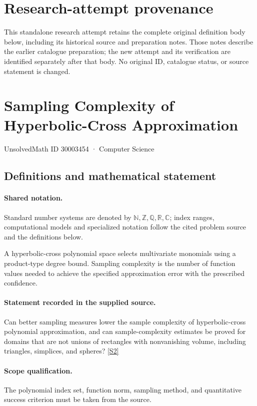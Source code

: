 \documentclass[11pt]{article}
\begin{document}
\section*{Research-attempt provenance}
This standalone research attempt retains the complete original definition body below,
including its historical source and preparation notes. Those notes describe the
earlier catalogue preparation; the new attempt and its verification are identified
separately after that body. No original ID, catalogue status, or source statement is changed.

\section{Sampling Complexity of Hyperbolic-Cross Approximation}\label{30003454}
{\small UnsolvedMath ID 30003454 · Computer Science}
\subsection{Definitions and mathematical statement}

\paragraph{Shared notation.}Standard number systems are denoted by $\mathbb N,\mathbb Z,\mathbb Q,\mathbb R,\mathbb C$; index ranges, computational models and specialized notation follow the cited problem source and the definitions below.


A hyperbolic-cross polynomial space selects multivariate monomials using a product-type degree bound. Sampling complexity is the number of function values needed to achieve the specified approximation error with the prescribed confidence.
\paragraph{Statement recorded in the supplied source.}
Can better sampling measures lower the sample complexity of hyperbolic-cross polynomial approximation, and can sample-complexity estimates be proved for domains that are not unions of rectangles with nonvanishing volume, including triangles, simplices, and spheres? \href{https://doi.org/10.4171/owr/2017/17}{[S2]}
\paragraph{Scope qualification.}
The polynomial index set, function norm, sampling method, and quantitative success criterion must be taken from the source.
\end{document}
